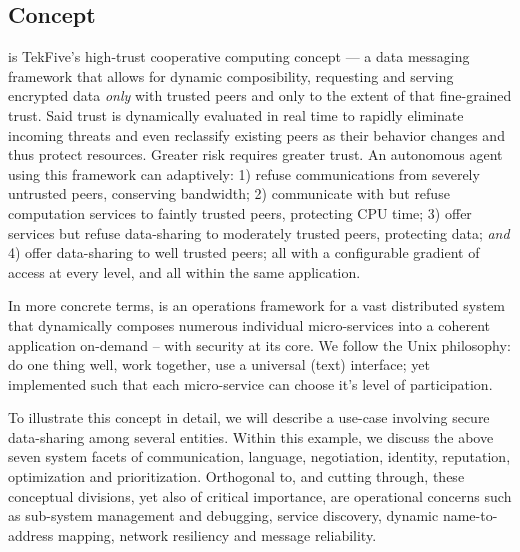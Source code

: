 \subsection{Concept}\label{subsec:concept}

\textbf{\projectName}is TekFive's high-trust cooperative computing concept --- a data messaging framework that allows for dynamic composibility, requesting and serving encrypted data \textit{only} with trusted peers and only to the extent of that fine-grained trust.
Said trust is dynamically evaluated in real time to rapidly eliminate incoming threats and even reclassify existing peers as their behavior changes and thus protect resources.
Greater risk requires greater trust.
An autonomous agent using this framework can adaptively: 1) refuse communications from severely untrusted peers, conserving bandwidth; 2) communicate with but refuse computation services to faintly trusted peers, protecting CPU time; 3) offer services but refuse data-sharing to moderately trusted peers, protecting data; \textit{and} 4) offer data-sharing to well trusted peers; all with a configurable gradient of access at every level, and all within the same application.

In more concrete terms, \projectName is an operations framework for a vast distributed system that dynamically composes numerous individual micro-services into a coherent application on-demand -- with security at its core.
We follow the Unix philosophy: do one thing well, work together, use a universal (text) interface; yet implemented such that each micro-service can choose it's level of participation.

To illustrate this concept in detail, we will describe a use-case involving secure data-sharing among several entities.
Within this example, we discuss the above seven system facets of communication, language, negotiation, identity, reputation, optimization and prioritization.
Orthogonal to, and cutting through, these conceptual divisions, yet also of critical importance, are operational concerns such as sub-system management and debugging, service discovery, dynamic name-to-address mapping, network resiliency and message reliability.
